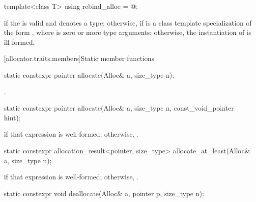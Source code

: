 %
\begin{itemdecl}
template<class T> using rebind_alloc = @\seebelow@;
\end{itemdecl}

\begin{itemdescr}
\pnum
\templalias {} if
the   is valid and denotes a
type; otherwise,
 if  is a class template specialization
of the form , where  is zero or more type arguments;
otherwise, the instantiation of  is ill-formed.
\end{itemdescr}

[allocator.traits.members]{Static member functions}

%
\begin{itemdecl}
static constexpr pointer allocate(Alloc& a, size_type n);
\end{itemdecl}

\begin{itemdescr}
\pnum
\returns
{}.
\end{itemdescr}

%
\begin{itemdecl}
static constexpr pointer allocate(Alloc& a, size_type n, const_void_pointer hint);
\end{itemdecl}

\begin{itemdescr}
\pnum
\returns
{} if that expression is well-formed; otherwise, .
\end{itemdescr}

%
\begin{itemdecl}
static constexpr allocation_result<pointer, size_type> allocate_at_least(Alloc& a, size_type n);
\end{itemdecl}

\begin{itemdescr}
\pnum
\returns
{} if that expression is well-formed;
otherwise, .
\end{itemdescr}

%
\begin{itemdecl}
static constexpr void deallocate(Alloc& a, pointer p, size_type n);
\end{itemdecl}

